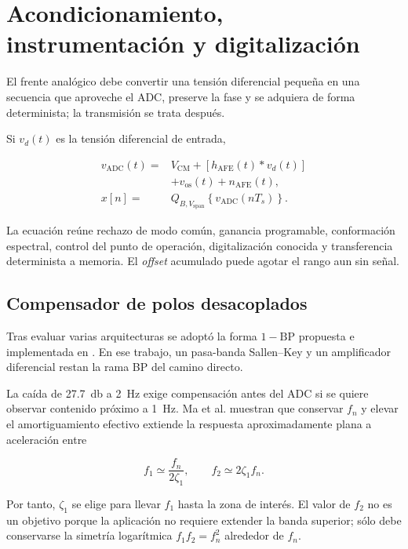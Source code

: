 \section{Acondicionamiento, instrumentación y digitalización}
\label{sec:acondicionamiento-digitalizacion}

El frente analógico debe convertir una tensión diferencial pequeña en una secuencia que
aproveche el ADC, preserve la fase y se adquiera de forma determinista; la transmisión
se trata después.

Si $v_d(t)$ es la tensión diferencial de entrada,

\begin{equation}
\begin{aligned}
v_{\mathrm{ADC}}(t)={}&V_{\mathrm{CM}}+\left[h_{\mathrm{AFE}}(t)*v_d(t)\right]\\
&+v_{\mathrm{os}}(t)+n_{\mathrm{AFE}}(t),\\
x[n]={}&Q_{B,V_{\mathrm{span}}}\!\left\{v_{\mathrm{ADC}}(nT_s)\right\}.
\end{aligned}
\label{eq:afe-general}
\end{equation}

La ecuación reúne rechazo de modo común, ganancia programable, conformación espectral,
control del punto de operación, digitalización conocida y transferencia determinista a
memoria. El \emph{offset} acumulado puede agotar el rango aun sin señal.

\subsection{Compensador de polos desacoplados}

Tras evaluar varias arquitecturas se adoptó la forma $1-\mathrm{BP}$ propuesta e
implementada en \cite{Ma2023}. En ese trabajo, un pasa-banda Sallen--Key y un
amplificador diferencial restan la rama BP del camino directo.

La caída de \SI{27.7}{\decibel} a \SI{2}{\hertz} exige compensación antes del ADC si se
quiere observar contenido próximo a \SI{1}{\hertz}. Ma et al. muestran que conservar
$f_n$ y elevar el amortiguamiento efectivo extiende la respuesta aproximadamente plana a
aceleración entre

\begin{equation}
f_1\simeq\frac{f_n}{2\zeta_1},
\qquad
f_2\simeq2\zeta_1f_n.
\end{equation}

Por tanto, $\zeta_1$ se elige para llevar $f_1$ hasta la zona de interés. El valor de
$f_2$ no es un objetivo porque la aplicación no requiere extender la banda superior;
sólo debe conservarse la simetría logarítmica $f_1f_2=f_n^2$ alrededor de $f_n$.

